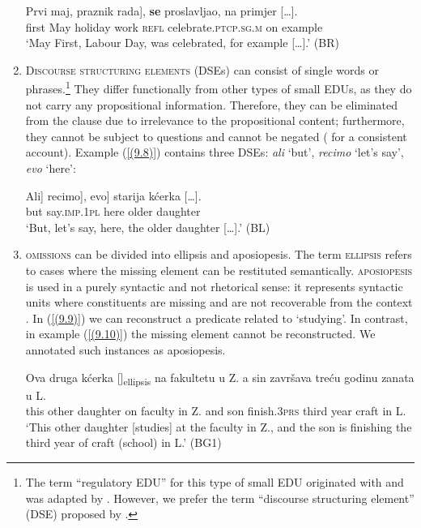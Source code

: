 \begin{enumerate}
\begin{exe}\ex\label{(9.7)}
\gll Prvi maj, \minsp{[} praznik rada], \textbf{se} proslavljao, na {primjer  [\dots].} \\
first May {} holiday work \textsc{refl} celebrate.\textsc{ptcp}.\textsc{sg}.\textsc{m} on example \\
\glt ‘May First, Labour Day, was celebrated, for example  [\dots].’
\hfill (BR)
\end{exe}

\item \textsc{Discourse structuring elements} (DSEs) can consist of single words or phrases.\footnote{The term ``regulatory EDU'' for this type of small EDU originated with \citet[63ff]{Chafe94} and was adapted by \citet[12f]{KibrikPodlesskaya06}. However, we prefer the term “discourse structuring element” (DSE) proposed by \citet{Birzer15}.} They differ functionally from other types of small EDUs, as they do not carry any propositional information. Therefore, they can be eliminated from the clause due to irrelevance to the propositional content; furthermore, they cannot be subject to questions and cannot be negated (\citealt[see][85f]{Birzer15} for a consistent account). Example (\ref{(9.8)}) contains three DSEs: \textit{ali} ‘but’, \textit{recimo} ‘let’s say’, \textit{evo} ‘here’:

\begin{exe}\ex\label{(9.8)}
\gll \minsp{[} Ali] \minsp{[} recimo], \minsp{[} evo] starija {kćerka  [\dots].} \\
{} but {} say.\textsc{imp}.1\textsc{pl} {} here older daughter \\
\glt ‘But, let’s say, here, the older daughter  [\dots].’
\hfill (BL)
\end{exe}

\item \textsc{omissions} can be divided into ellipsis and aposiopesis. The term \textsc{ellipsis} refers to cases where the missing element can be restituted semantically. \textsc{aposiopesis} is used in a purely syntactic and not rhetorical sense: it represents syntactic units where constituents are missing and are not recoverable from the context \citep[cf.][]{Karlik17a}. In (\ref{(9.9)}) we can reconstruct a predicate related to ‘studying’. In contrast, in example (\ref{(9.10)}) the missing element cannot be reconstructed. We annotated such instances as aposiopesis.

\begin{exe}\ex\label{(9.9)}
\gll Ova druga kćerka []\textsubscript{ellipsis} na fakultetu u Z. a sin završava treću godinu zanata u L.\\
this other daughter {} on faculty in Z. and son finish.3\textsc{prs} third year craft in L.\\
\glt ‘This other daughter [studies] at the faculty in Z., and the son is finishing the third year of craft (school) in L.’
\hfill (BG1)


\end{exe}
\end{enumerate}
